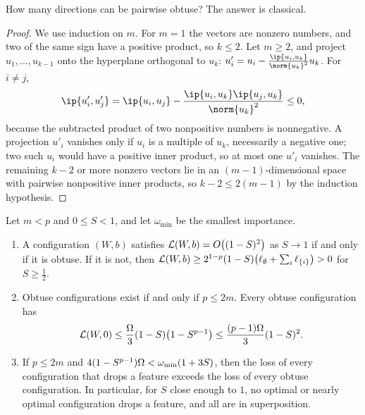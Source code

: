 \begin{refsection}
How many directions can be pairwise obtuse? The answer is classical.


\begin{proof}
We use induction on $m$. For $m=1$ the vectors are nonzero numbers, and two of the same sign have a positive product, so $k\le2$. Let $m\ge2$, and project $u_1,\dots,u_{k-1}$ onto the hyperplane orthogonal to $u_k$: $u'_i=u_i-\frac{\ip{u_i,u_k}}{\norm{u_k}^2}u_k$. For $i\ne j$,
\[
  \ip{u'_i,u'_j}=\ip{u_i,u_j}-\frac{\ip{u_i,u_k}\ip{u_j,u_k}}{\norm{u_k}^2}\le0,
\]
because the subtracted product of two nonpositive numbers is nonnegative. A projection $u'_i$ vanishes only if $u_i$ is a multiple of $u_k$, necessarily a negative one; two such $u_i$ would have a positive inner product, so at most one $u'_i$ vanishes. The remaining $k-2$ or more nonzero vectors lie in an $(m-1)$-dimensional space with pairwise nonpositive inner products, so $k-2\le2(m-1)$ by the induction hypothesis.
\end{proof}

\begin{theorem}\label{thm:superposition:sparse}
Let $m<p$ and $0\le S<1$, and let $\omega_{\min}$ be the smallest importance.
\begin{enumerate}
\item A configuration $(W,b)$ satisfies $\mathcal{L}(W,b)=O\bigl((1-S)^2\bigr)$ as $S\to1$ if and only if it is obtuse. If it is not, then $\mathcal{L}(W,b)\ge2^{1-p}(1-S)\bigl(\ell_\emptyset+\sum_i\ell_{\{i\}}\bigr)>0$ for $S\ge\frac12$.
\item Obtuse configurations exist if and only if $p\le2m$. Every obtuse configuration has
\[
  \mathcal{L}(W,0)\le\frac{\Omega}3(1-S)\bigl(1-S^{p-1}\bigr)\le\frac{(p-1)\Omega}3(1-S)^2 .
\]
\item If $p\le2m$ and $4(1-S^{p-1})\Omega<\omega_{\min}(1+3S)$, then the loss of every configuration that drops a feature exceeds the loss of every obtuse configuration. In particular, for $S$ close enough to $1$, no optimal or nearly optimal configuration drops a feature, and all are in superposition.
\end{enumerate}
\end{theorem}


\end{refsection}
